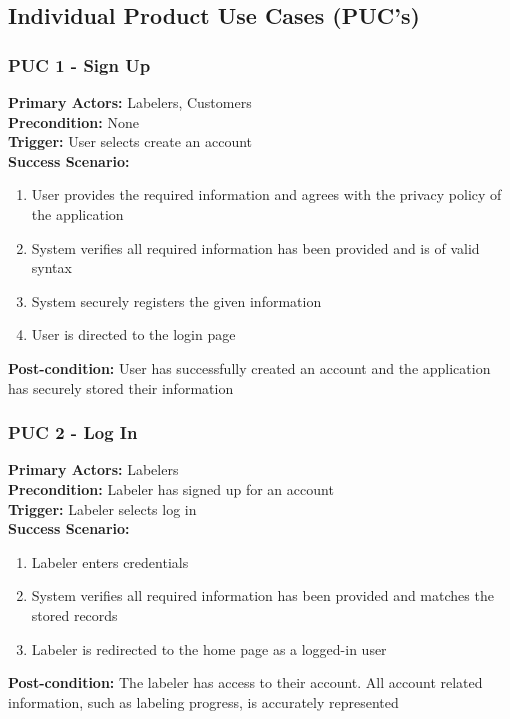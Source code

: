 \documentclass[12pt]{article}
\begin{document}
\subsection{Individual Product Use Cases (PUC's)}
\subsubsection{PUC 1 - Sign Up}
\textbf{Primary Actors:} Labelers, Customers\\ 
\textbf{Precondition:} None\\
\textbf{Trigger:} User selects create an account\\
\textbf{Success Scenario:}
\begin{enumerate}
    \item User provides the required information and agrees with the privacy policy of the application
    \item System verifies all required information has been provided and is of valid syntax
    \item System securely registers the given information
    \item User is directed to the login page
\end{enumerate}
\textbf{Post-condition:} User has successfully created an account and the application has securely stored their information

\subsubsection{PUC 2 - Log In}
\textbf{Primary Actors:} Labelers\\ 
\textbf{Precondition:} Labeler has signed up for an account\\
\textbf{Trigger:} Labeler selects log in\\
\textbf{Success Scenario:}
\begin{enumerate}
    \item Labeler enters credentials
    \item System verifies all required information has been provided and matches the stored records
    \item Labeler is redirected to the home page as a logged-in user
\end{enumerate}
\textbf{Post-condition:} The labeler has access to their account. All account related information, such as labeling progress, is accurately represented
\end{document}
